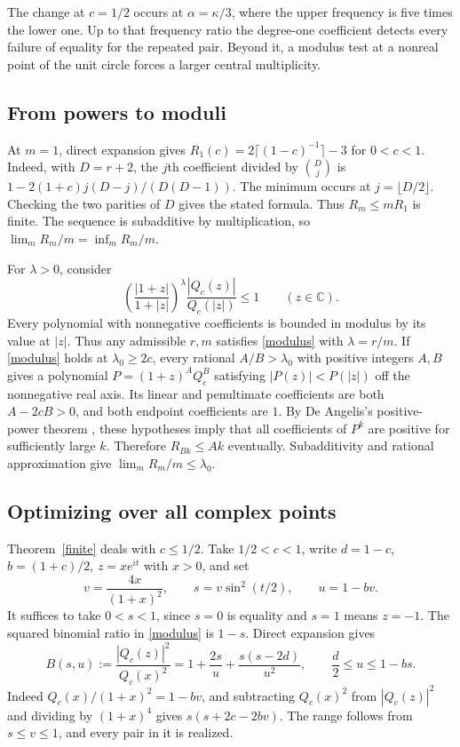 \documentclass[11pt]{article}
\begin{document}
The change at $c=1/2$ occurs at $\alpha=\kappa/3$, where the upper frequency is five times the lower one. Up to that frequency ratio the degree-one coefficient detects every failure of equality for the repeated pair. Beyond it, a modulus test at a nonreal point of the unit circle forces a larger central multiplicity.

\subsection{From powers to moduli}

At $m=1$, direct expansion gives $R_1(c)=2\lceil(1-c)^{-1}\rceil-3$ for $0<c<1$. Indeed, with $D=r+2$, the $j$th coefficient divided by $\binom Dj$ is
$1-2(1+c)j(D-j)/(D(D-1))$. The minimum occurs at $j=\lfloor D/2\rfloor$. Checking the two parities of $D$ gives the stated formula. Thus $R_m\le mR_1$ is finite. The sequence is subadditive by multiplication, so $\lim_m R_m/m=\inf_m R_m/m$.

For $\lambda>0$, consider
\begin{equation}\label{modulus}
 \left(\frac{|1+z|}{1+|z|}\right)^\lambda
     \frac{|Q_c(z)|}{Q_c(|z|)}\le1 \qquad(z\in\mathbb C).
\end{equation}
Every polynomial with nonnegative coefficients is bounded in modulus by its value at $|z|$. Thus any admissible $r,m$ satisfies \eqref{modulus} with $\lambda=r/m$. If \eqref{modulus} holds at $\lambda_0\ge 2c$, every rational $A/B>\lambda_0$ with positive integers $A,B$ gives a polynomial $P=(1+z)^A Q_c^B$ satisfying $|P(z)|<P(|z|)$ off the nonnegative real axis. Its linear and penultimate coefficients are both $A-2cB>0$, and both endpoint coefficients are $1$. By De Angelis's positive-power theorem \cite{deangelis}, these hypotheses imply that all coefficients of $P^k$ are positive for sufficiently large $k$. Therefore $R_{Bk}\le Ak$ eventually. Subadditivity and rational approximation give $\lim_m R_m/m\le\lambda_0$.

\subsection{Optimizing over all complex points}

Theorem~\ref{finite} deals with $c\le1/2$. Take $1/2<c<1$, write $d=1-c$, $b=(1+c)/2$, $z=xe^{it}$ with $x>0$, and set
\[
 v=\frac{4x}{(1+x)^2},\qquad s=v\sin^2(t/2),\qquad u=1-bv .
\]
It suffices to take $0<s<1$, since $s=0$ is equality and $s=1$ means $z=-1$. The squared binomial ratio in \eqref{modulus} is $1-s$. Direct expansion gives
\begin{equation}\label{quadratic}
 B(s,u):=\frac{|Q_c(z)|^2}{Q_c(x)^2}
     =1+\frac{2s}{u}+\frac{s(s-2d)}{u^2},
 \qquad \frac d2\le u\le1-bs .
\end{equation}
Indeed $Q_c(x)/(1+x)^2=1-bv$, and subtracting $Q_c(x)^2$ from $|Q_c(z)|^2$ and dividing by $(1+x)^4$ gives $s(s+2c-2bv)$. The range follows from $s\le v\le1$, and every pair in it is realized.
\end{document}
